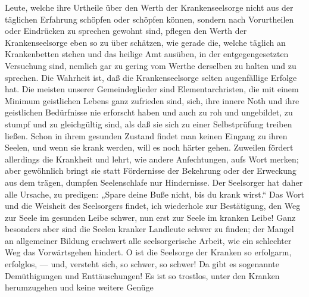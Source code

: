 Leute, welche ihre Urtheile über den Werth der Krankenseelsorge nicht aus der täglichen Erfahrung schöpfen oder schöpfen können, sondern nach Vorurtheilen oder Eindrücken zu sprechen gewohnt sind, pflegen den Werth der Krankenseelsorge eben so zu über%
schätzen, wie gerade die, welche täglich an Krankenbetten stehen und das heilige Amt ausüben, in der entgegengesetzten Versuchung sind, nemlich gar zu gering vom Werthe derselben zu halten und zu sprechen. Die Wahrheit ist, daß die Krankenseelsorge selten augenfällige Erfolge hat. Die meisten unserer Gemeindeglieder sind Elementarchristen, die mit einem Minimum geistlichen Lebens ganz zufrieden sind, sich, ihre innere Noth und ihre geistlichen Bedürfnisse nie erforscht haben und auch zu roh und ungebildet, zu stumpf und zu gleichgültig sind, als daß sie sich zu einer Selbstprüfung treiben ließen. Schon in ihrem gesunden Zustand findet man keinen Eingang zu ihren Seelen, und wenn sie krank werden, will es noch härter gehen. Zuweilen fördert allerdings die Krankheit und lehrt, wie andere Anfechtungen, aufs Wort merken; aber gewöhnlich bringt sie statt Fördernisse der Bekehrung oder der Erweckung aus dem trägen, dumpfen Seelenschlafe nur Hindernisse. Der Seelsorger hat daher alle Ursache, zu predigen: „Spare deine Buße nicht, bis du krank wirst.“ Das Wort und die Weisheit des Seelsorgers findet, ich wiederhole zur Bestätigung, den Weg zur Seele im gesunden Leibe schwer, nun erst zur Seele im kranken Leibe! Ganz besonders aber sind die Seelen kranker Landleute schwer zu finden; der Mangel an allgemeiner Bildung erschwert alle seelsorgerische Arbeit, wie ein schlechter Weg das Vorwärtsgehen hindert. O ist die Seelsorge der Kranken so erfolgarm, erfolglos, — und, versteht sich, so schwer, so schwer! Da gibt es sogenannte Demüthigungen und Enttäuschungen! Es ist so trostlos, unter den Kranken herumzugehen und keine weitere Genüge
